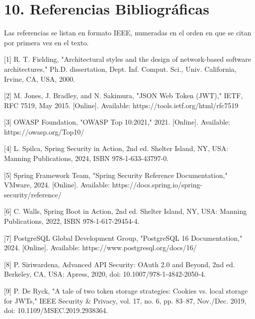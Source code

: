 \documentclass[
]{article}
\begin{document}
\section{10. Referencias
Bibliográficas}

Las referencias se listan en formato IEEE, numeradas en el orden en que
se citan por primera vez en el texto.

{[}1{]} R. T. Fielding, "Architectural styles and the design of
network-based software architectures," Ph.D. dissertation, Dept. Inf.
Comput. Sci., Univ. California, Irvine, CA, USA, 2000.

{[}2{]} M. Jones, J. Bradley, and N. Sakimura, "JSON Web Token (JWT),"
IETF, RFC 7519, May 2015. {[}Online{]}. Available:
https://tools.ietf.org/html/rfc7519

{[}3{]} OWASP Foundation, "OWASP Top 10:2021," 2021. {[}Online{]}.
Available: https://owasp.org/Top10/

{[}4{]} L. Spilca, Spring Security in Action, 2nd ed. Shelter Island,
NY, USA: Manning Publications, 2024, ISBN 978-1-633-43797-0.

{[}5{]} Spring Framework Team, "Spring Security Reference
Documentation," VMware, 2024. {[}Online{]}. Available:
https://docs.spring.io/spring-security/reference/

{[}6{]} C. Walls, Spring Boot in Action, 2nd ed. Shelter Island, NY,
USA: Manning Publications, 2022, ISBN 978-1-617-29454-4.

{[}7{]} PostgreSQL Global Development Group, "PostgreSQL 16
Documentation," 2024. {[}Online{]}. Available:
https://www.postgresql.org/docs/16/

{[}8{]} P. Siriwardena, Advanced API Security: OAuth 2.0 and Beyond, 2nd
ed. Berkeley, CA, USA: Apress, 2020, doi: 10.1007/978-1-4842-2050-4.

{[}9{]} P. De Ryck, "A tale of two token storage strategies: Cookies vs.
local storage for JWTs," IEEE Security \& Privacy, vol. 17, no. 6, pp.
83--87, Nov./Dec. 2019, doi: 10.1109/MSEC.2019.2938364.
\end{document}
